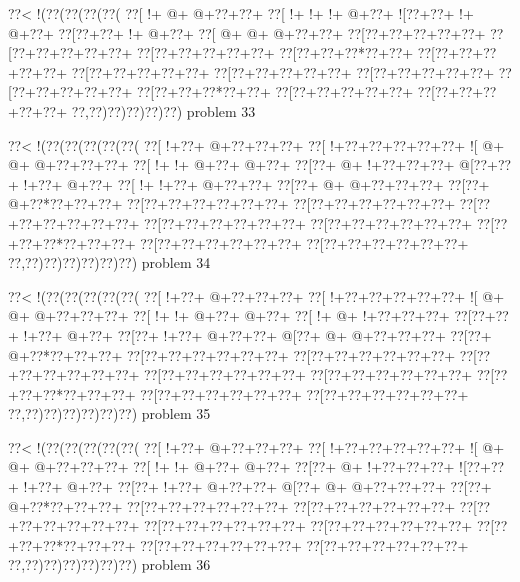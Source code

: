 \vbox{\vbox{\goo
\0??<\- !(\0??(\0??(\0??(\0??(
\0??[\- !+\- @+\- @+\0??+\0??+
\0??[\- !+\- !+\- !+\- @+\0??+
\- ![\0??+\0??+\- !+\- @+\0??+
\0??[\0??+\0??+\- !+\- @+\0??+
\0??[\- @+\- @+\- @+\0??+\0??+
\0??[\0??+\0??+\0??+\0??+\0??+
\0??[\0??+\0??+\0??+\0??+\0??+
\0??[\0??+\0??+\0??+\0??+\0??+
\0??[\0??+\0??+\0??*\0??+\0??+
\0??[\0??+\0??+\0??+\0??+\0??+
\0??[\0??+\0??+\0??+\0??+\0??+
\0??[\0??+\0??+\0??+\0??+\0??+
\0??[\0??+\0??+\0??+\0??+\0??+
\0??[\0??+\0??+\0??+\0??+\0??+
\0??[\0??+\0??+\0??*\0??+\0??+
\0??[\0??+\0??+\0??+\0??+\0??+
\0??[\0??+\0??+\0??+\0??+\0??+
\0??,\0??)\0??)\0??)\0??)\0??)
}
\hfil problem 33\hfil\break
}

\vbox{\vbox{\goo
\0??<\- !(\0??(\0??(\0??(\0??(\0??(
\0??[\- !+\0??+\- @+\0??+\0??+\0??+
\0??[\- !+\0??+\0??+\0??+\0??+\0??+
\- ![\- @+\- @+\- @+\0??+\0??+\0??+
\0??[\- !+\- !+\- @+\0??+\- @+\0??+
\0??[\0??+\- @+\- !+\0??+\0??+\0??+
\- @[\0??+\0??+\- !+\0??+\- @+\0??+
\0??[\- !+\- !+\0??+\- @+\0??+\0??+
\0??[\0??+\- @+\- @+\0??+\0??+\0??+
\0??[\0??+\- @+\0??*\0??+\0??+\0??+
\0??[\0??+\0??+\0??+\0??+\0??+\0??+
\0??[\0??+\0??+\0??+\0??+\0??+\0??+
\0??[\0??+\0??+\0??+\0??+\0??+\0??+
\0??[\0??+\0??+\0??+\0??+\0??+\0??+
\0??[\0??+\0??+\0??+\0??+\0??+\0??+
\0??[\0??+\0??+\0??*\0??+\0??+\0??+
\0??[\0??+\0??+\0??+\0??+\0??+\0??+
\0??[\0??+\0??+\0??+\0??+\0??+\0??+
\0??,\0??)\0??)\0??)\0??)\0??)\0??)
}
\hfil problem 34\hfil\break
}

\vbox{\vbox{\goo
\0??<\- !(\0??(\0??(\0??(\0??(\0??(
\0??[\- !+\0??+\- @+\0??+\0??+\0??+
\0??[\- !+\0??+\0??+\0??+\0??+\0??+
\- ![\- @+\- @+\- @+\0??+\0??+\0??+
\0??[\- !+\- !+\- @+\0??+\- @+\0??+
\0??[\- !+\- @+\- !+\0??+\0??+\0??+
\0??[\0??+\0??+\- !+\0??+\- @+\0??+
\0??[\0??+\- !+\0??+\- @+\0??+\0??+
\- @[\0??+\- @+\- @+\0??+\0??+\0??+
\0??[\0??+\- @+\0??*\0??+\0??+\0??+
\0??[\0??+\0??+\0??+\0??+\0??+\0??+
\0??[\0??+\0??+\0??+\0??+\0??+\0??+
\0??[\0??+\0??+\0??+\0??+\0??+\0??+
\0??[\0??+\0??+\0??+\0??+\0??+\0??+
\0??[\0??+\0??+\0??+\0??+\0??+\0??+
\0??[\0??+\0??+\0??*\0??+\0??+\0??+
\0??[\0??+\0??+\0??+\0??+\0??+\0??+
\0??[\0??+\0??+\0??+\0??+\0??+\0??+
\0??,\0??)\0??)\0??)\0??)\0??)\0??)
}
\hfil problem 35\hfil\break
}

\vbox{\vbox{\goo
\0??<\- !(\0??(\0??(\0??(\0??(\0??(
\0??[\- !+\0??+\- @+\0??+\0??+\0??+
\0??[\- !+\0??+\0??+\0??+\0??+\0??+
\- ![\- @+\- @+\- @+\0??+\0??+\0??+
\0??[\- !+\- !+\- @+\0??+\- @+\0??+
\0??[\0??+\- @+\- !+\0??+\0??+\0??+
\- ![\0??+\0??+\- !+\0??+\- @+\0??+
\0??[\0??+\- !+\0??+\- @+\0??+\0??+
\- @[\0??+\- @+\- @+\0??+\0??+\0??+
\0??[\0??+\- @+\0??*\0??+\0??+\0??+
\0??[\0??+\0??+\0??+\0??+\0??+\0??+
\0??[\0??+\0??+\0??+\0??+\0??+\0??+
\0??[\0??+\0??+\0??+\0??+\0??+\0??+
\0??[\0??+\0??+\0??+\0??+\0??+\0??+
\0??[\0??+\0??+\0??+\0??+\0??+\0??+
\0??[\0??+\0??+\0??*\0??+\0??+\0??+
\0??[\0??+\0??+\0??+\0??+\0??+\0??+
\0??[\0??+\0??+\0??+\0??+\0??+\0??+
\0??,\0??)\0??)\0??)\0??)\0??)\0??)
}
\hfil problem 36\hfil\break
}

